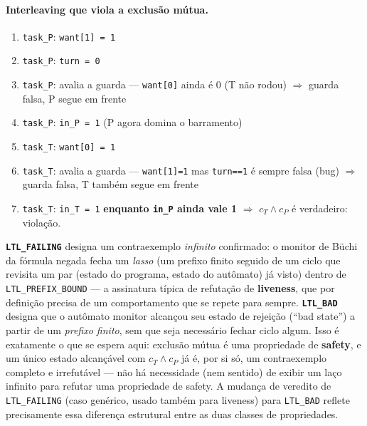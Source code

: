 \documentclass[12pt,a4paper]{article}
\newcommand{\vv}[1]{\texttt{#1}}
\begin{document}
\paragraph{Interleaving que viola a exclus\~ao m\'utua.}
\begin{enumerate}[leftmargin=2cm]
  \item \texttt{task\_P}: \vv{want[1] = 1}
  \item \texttt{task\_P}: \vv{turn = 0}
  \item \texttt{task\_P}: avalia a guarda --- \vv{want[0]} ainda \'e 0 (T n\~ao rodou) $\Rightarrow$ guarda falsa, P segue em frente
  \item \texttt{task\_P}: \vv{in\_P = 1} (P agora domina o barramento)
  \item \texttt{task\_T}: \vv{want[0] = 1}
  \item \texttt{task\_T}: avalia a guarda --- \vv{want[1]=1} mas \vv{turn==1} \'e sempre falsa (bug) $\Rightarrow$ guarda falsa, T tamb\'em segue em frente
  \item \texttt{task\_T}: \vv{in\_T = 1} \textbf{enquanto \vv{in\_P} ainda vale 1} $\Rightarrow$ $c_T\wedge c_P$ \'e verdadeiro: viola\c{c}\~ao.
\end{enumerate}

\begin{tcolorbox}[notabox]
\textbf{\texttt{LTL\_FAILING}} designa um contraexemplo \emph{infinito} confirmado: o
monitor de B\"uchi da f\'ormula negada fecha um \emph{lasso} (um prefixo finito seguido de
um ciclo que revisita um par (estado do programa, estado do aut\^omato) j\'a visto) dentro
de \texttt{LTL\_PREFIX\_BOUND} --- a assinatura t\'ipica de refuta\c{c}\~ao de
\textbf{liveness}, que por defini\c{c}\~ao precisa de um comportamento que se repete para
sempre. \textbf{\texttt{LTL\_BAD}} designa que o aut\^omato monitor alcan\c{c}ou seu
estado de rejei\c{c}\~ao (``bad state'') a partir de um \emph{prefixo finito}, sem que seja
necess\'ario fechar ciclo algum. Isso \'e exatamente o que se espera aqui: exclus\~ao
m\'utua \'e uma propriedade de \textbf{safety}, e um \'unico estado alcan\c{c}\'avel com
$c_T\wedge c_P$ j\'a \'e, por si s\'o, um contraexemplo completo e irrefut\'avel --- n\~ao
h\'a necessidade (nem sentido) de exibir um la\c{c}o infinito para refutar uma propriedade
de safety. A mudan\c{c}a de veredito de \texttt{LTL\_FAILING} (caso gen\'erico, usado
tamb\'em para liveness) para \texttt{LTL\_BAD} reflete precisamente essa diferen\c{c}a
estrutural entre as duas classes de propriedades.
\end{tcolorbox}
\end{document}
